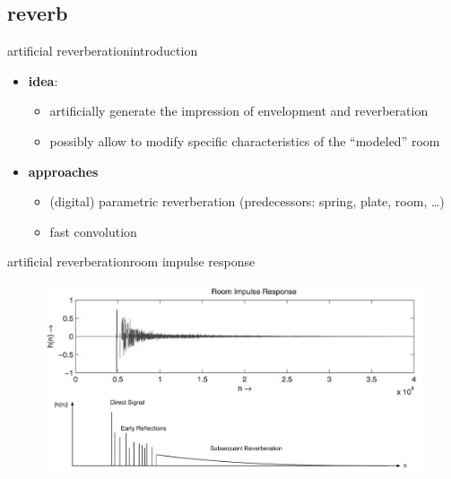 \subsection{reverb}
\begin{frame}{artificial reverberation}{introduction}
	\begin{itemize}
		\item	\textbf{idea}:\\
				\begin{itemize}
					\item	artificially generate the impression of envelopment and reverberation
					\item	possibly allow to modify specific characteristics of the ``modeled'' room
				\end{itemize}
		\pause
		\item	\textbf{approaches}
			\begin{itemize}
				\item	(digital) parametric reverberation (predecessors: spring, plate, room, \ldots)
				\item	fast convolution
			\end{itemize}	
	\end{itemize}
\end{frame}

\begin{frame}{artificial reverberation}{room impulse response}
	\begin{figure}
		\centerline{\includegraphics[scale=.4]{graph/IR}}
	\end{figure}
\end{frame}

